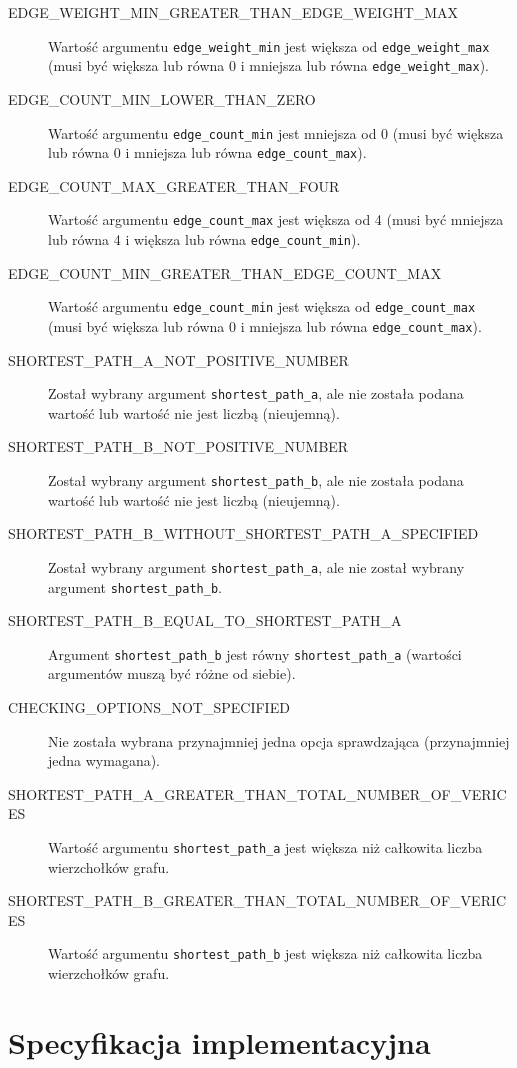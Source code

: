 \documentclass[11pt,a4paper]{report}
\begin{document}
\begin{description}
        \item[EDGE\_WEIGHT\_MIN\_GREATER\_THAN\_EDGE\_WEIGHT\_MAX] Wartość argumentu \verb|edge_weight_min| jest większa od \verb|edge_weight_max| (musi być większa lub równa 0 i mniejsza lub równa \verb|edge_weight_max|).
        \item[EDGE\_COUNT\_MIN\_LOWER\_THAN\_ZERO] Wartość argumentu \verb|edge_count_min| jest mniejsza od 0 (musi być większa lub równa 0 i mniejsza lub równa \verb|edge_count_max|).
        \item[EDGE\_COUNT\_MAX\_GREATER\_THAN\_FOUR] Wartość argumentu \verb|edge_count_max| jest większa od 4 (musi być mniejsza lub równa 4 i większa lub równa \verb|edge_count_min|).
        \item[EDGE\_COUNT\_MIN\_GREATER\_THAN\_EDGE\_COUNT\_MAX] Wartość argumentu \verb|edge_count_min| jest większa od \verb|edge_count_max| (musi być większa lub równa 0 i mniejsza lub równa \verb|edge_count_max|).
        \item[SHORTEST\_PATH\_A\_NOT\_POSITIVE\_NUMBER] Został wybrany argument \verb|shortest_path_a|, ale nie została podana wartość lub wartość nie jest liczbą (nieujemną).
        \item[SHORTEST\_PATH\_B\_NOT\_POSITIVE\_NUMBER] Został wybrany argument \verb|shortest_path_b|, ale nie została podana wartość lub wartość nie jest liczbą (nieujemną).
        \item[SHORTEST\_PATH\_B\_WITHOUT\_SHORTEST\_PATH\_A\_SPECIFIED] Został wybrany argument \verb|shortest_path_a|, ale nie został wybrany argument \verb|shortest_path_b|.
        \item[SHORTEST\_PATH\_B\_EQUAL\_TO\_SHORTEST\_PATH\_A] Argument \verb|shortest_path_b| jest równy \verb|shortest_path_a| (wartości argumentów muszą być różne od siebie).
        \item[CHECKING\_OPTIONS\_NOT\_SPECIFIED] Nie została wybrana przynajmniej jedna opcja sprawdzająca (przynajmniej jedna wymagana).
        \item[SHORTEST\_PATH\_A\_GREATER\_THAN\_TOTAL\_NUMBER\_OF\_VERICES] Wartość argumentu \verb|shortest_path_a| jest większa niż całkowita liczba wierzchołków grafu.
        \item[SHORTEST\_PATH\_B\_GREATER\_THAN\_TOTAL\_NUMBER\_OF\_VERICES] Wartość argumentu \verb|shortest_path_b| jest większa niż całkowita liczba wierzchołków grafu. 
    \end{description}


    \chapter{Specyfikacja implementacyjna}    
\end{document}
